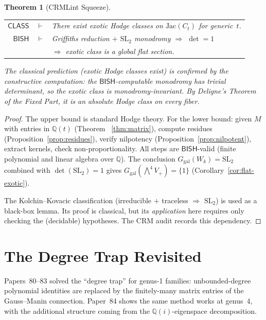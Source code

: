 \documentclass[11pt]{article}
\theoremstyle{plain}
\newtheorem{theorem}{Theorem}[section]
\theoremstyle{definition}
\theoremstyle{remark}
\newcommand{\Q}{\mathbb{Q}}
\newcommand{\SL}{\mathrm{SL}}
\newcommand{\Ggal}{G_{\mathrm{gal}}}
\newcommand{\BISH}{\ensuremath{\mathsf{BISH}}}
\newcommand{\CLASS}{\ensuremath{\mathsf{CLASS}}}
\begin{document}
\begin{theorem}[CRMLint Squeeze]\label{thm:squeeze}
\begin{center}
\begin{tabular}{rcl}
$\CLASS$ & $\vdash$ & There exist exotic Hodge classes on
  $\mathrm{Jac}(C_t)$ for generic~$t$.\\
$\BISH$ & $\vdash$ & Griffiths reduction $+$ $\SL_2$ monodromy
  $\Rightarrow$ $\det = 1$ \\
 & & $\Rightarrow$ exotic class is a global flat section.
\end{tabular}
\end{center}
The classical prediction (exotic Hodge classes exist) is
\emph{confirmed} by the constructive computation: the
$\BISH$-computable monodromy has trivial determinant, so the
exotic class is monodromy-invariant. By Deligne's Theorem of
the Fixed Part, it is an absolute Hodge class on every fiber.
\end{theorem}

\begin{proof}
The upper bound is standard Hodge theory.
For the lower bound: given $M$ with entries in $\Q(t)$ (Theorem~%
\ref{thm:matrix}), compute residues (Proposition~\ref{prop:residues}),
verify nilpotency (Proposition~\ref{prop:nilpotent}), extract kernels,
check non-proportionality. All steps are $\BISH$-valid (finite
polynomial and linear algebra over $\Q$). The conclusion
$\Ggal(W_k) = \SL_2$ combined with $\det(\SL_2) = 1$ gives
$\Ggal(\bigwedge^4 V_+) = \{1\}$ (Corollary~\ref{cor:flat-exotic}).

The Kolchin--Kovacic classification (irreducible $+$ traceless
$\Rightarrow$ $\SL_2$) is used as a black-box lemma. Its proof is
classical, but its \emph{application} here requires only checking
the (decidable) hypotheses. The CRM audit records this dependency.
\end{proof}

\section{The Degree Trap Revisited}\label{sec:trap}

Papers~80--83 solved the ``degree trap'' for genus-1 families:
unbounded-degree polynomial identities are replaced by the
finitely-many matrix entries of the Gauss--Manin connection.
Paper~84 shows the same method works at genus~4, with the
additional structure coming from the $\Q(i)$-eigenspace decomposition.
\end{document}
